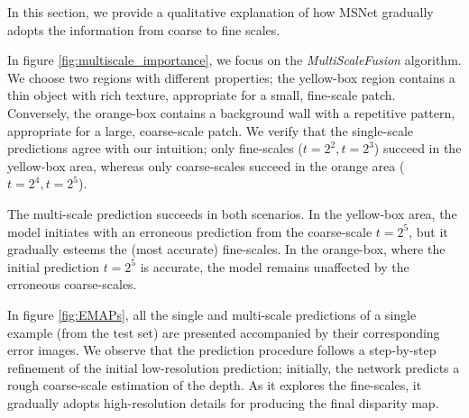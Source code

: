 \documentclass[runningheads]{llncs}
\begin{document}
In this section, we provide a qualitative explanation of how MSNet gradually adopts the information from coarse to fine scales.

In figure \ref{fig:multiscale_importance}, we focus on the \textit{MultiScaleFusion} algorithm. We choose two regions with different properties; the yellow-box region contains a thin object with rich texture, appropriate for a small, fine-scale patch. Conversely, the orange-box contains a background wall with a repetitive pattern, appropriate for a large, coarse-scale patch. We verify that the single-scale predictions agree with our intuition; only fine-scales ($t=2^2, t = 2^3$) succeed in the yellow-box area, whereas only coarse-scales succeed in the orange area ($t =2^4, t=2^5$). 

The multi-scale prediction succeeds in both scenarios. In the yellow-box area, the model initiates with an erroneous prediction from the coarse-scale $t=2^5$, but it gradually esteems the (most accurate) fine-scales. In the orange-box, where the initial prediction $t=2^5$ is accurate, the model remains unaffected by the erroneous coarse-scales. 

In figure \ref{fig:EMAPs}, all the single and multi-scale predictions of a single example (from the test set) are presented accompanied by their corresponding error images. We observe that the prediction procedure follows a step-by-step refinement of the initial low-resolution prediction; initially, the network predicts a rough coarse-scale estimation of the depth. As it explores the fine-scales, it gradually adopts high-resolution details for producing the final disparity map.
\end{document}
